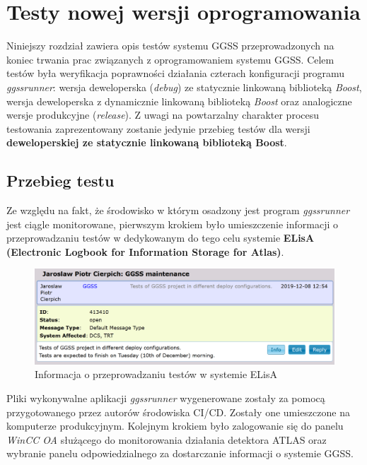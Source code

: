 \chapter{Testy nowej wersji oprogramowania}
\label{cha:test}
Niniejszy rozdział zawiera opis testów systemu GGSS przeprowadzonych na koniec trwania prac związanych z oprogramowaniem systemu GGSS. Celem testów była weryfikacja poprawności działania czterach konfiguracji programu \textit{ggssrunner}: wersja deweloperska (\textit{debug}) ze statycznie linkowaną biblioteką \textit{Boost}, wersja deweloperska z dynamicznie linkowaną biblioteką \textit{Boost} oraz analogiczne wersje produkcyjne (\textit{release}). Z uwagi na powtarzalny charakter procesu testowania zaprezentowany zostanie jedynie przebieg testów dla wersji \textbf{deweloperskiej ze statycznie linkowaną biblioteką Boost}. 

\section{Przebieg testu}
Ze względu na fakt, że środowisko w którym osadzony jest program \textit{ggssrunner} jest ciągle monitorowane, pierwszym krokiem było umieszczenie informacji o przeprowadzaniu testów w dedykowanym do tego celu systemie \textbf{ELisA (Electronic Logbook for Information Storage for Atlas)}.

\begin{figure}[H]
\centering
\caption{Informacja o przeprowadzaniu testów w systemie ELisA}
\label{fig:elisa}
\includegraphics[width=\textwidth]{res/png/elisa}
\end{figure}

Pliki wykonywalne aplikacji \textit{ggssrunner} wygenerowane zostały za pomocą przygotowanego przez autorów środowiska CI/CD. Zostały one umieszczone na komputerze produkcyjnym. Kolejnym krokiem było zalogowanie się do panelu \textit{WinCC OA} służącego do monitorowania działania detektora ATLAS oraz wybranie panelu odpowiedzialnego za dostarczanie informacji o systemie GGSS. 

